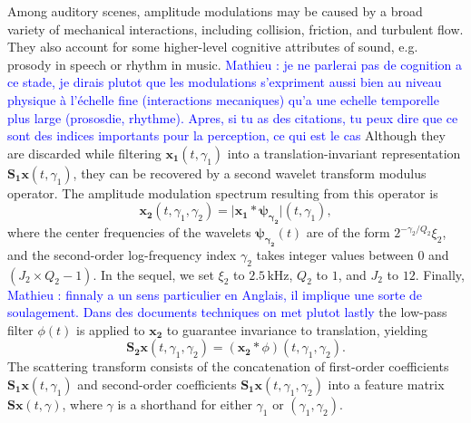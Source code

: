 \documentclass[journal]{IEEEtran}
\makeatletter
\newcommand*{\eg}{e.g.\@\xspace}
\newcommand{\ml}[1]{\textcolor{blue}{ Mathieu : #1}}
\makeatother
\begin{document}
Among auditory scenes, amplitude modulations may be caused by a broad variety of mechanical interactions, including collision, friction, and turbulent flow.
They also account for some higher-level cognitive attributes of sound, \eg prosody in speech or rhythm in music. \ml{je ne parlerai pas de cognition a ce stade, je dirais plutot que les modulations s'expriment aussi bien au niveau physique à l'échelle fine (interactions mecaniques) qu'a une echelle temporelle plus large (prososdie, rhythme). Apres, si tu as des citations, tu peux dire que ce sont des indices importants pour la perception, ce qui est le cas}
Although they are discarded while filtering $\boldsymbol{x_1}(t,\gamma_1)$ into a translation-invariant representation $\mathbf{S_1}\boldsymbol{x}(t,\gamma_1)$, they can be recovered by a second wavelet transform modulus operator.
The amplitude modulation spectrum resulting from this operator is
\begin{equation}
\boldsymbol{x_2}(t,\gamma_1,\gamma_2) =
\vert \boldsymbol{x_1} \ast \boldsymbol{\psi_{\gamma_2}} \vert(t,\gamma_1),
\end{equation}
where the center frequencies of the wavelets $\boldsymbol{\psi_{\gamma_2}}(t)$ are of the form $2^{-\gamma_2/Q_2} \xi_2$, and the second-order log-frequency index $\gamma_2$ takes integer values between $0$ and $(J_2 \times Q_2 - 1)$.
In the sequel, we set $\xi_2$ to $2.5\,\mathrm{kHz}$, $Q_2$ to $1$, and $J_2$ to $12$. Finally, \ml{finnaly a un sens particulier en Anglais, il implique une sorte de soulagement. Dans des documents techniques on met plutot lastly} the low-pass filter $\phi(t)$ is applied to $\boldsymbol{x_2}$ to guarantee invariance to translation, yielding
\begin{equation}
\mathbf{S_2}\boldsymbol{x}(t,\gamma_1,\gamma_2) =
(\boldsymbol{x_2} \ast \phi)(t,\gamma_1,\gamma_2).
\end{equation}
The scattering transform consists of the concatenation of first-order coefficients $\mathbf{S_1}\boldsymbol{x}(t,\gamma_1)$ and second-order coefficients $\mathbf{S_1}\boldsymbol{x}(t,\gamma_1,\gamma_2)$ into a feature matrix $\mathbf{S}\boldsymbol{x}(t,\gamma)$, where $\gamma$ is a shorthand for either $\gamma_1$ or $(\gamma_1,\gamma_2)$.
\end{document}
